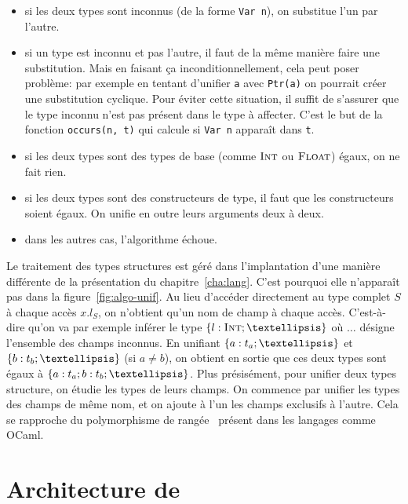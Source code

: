 \begin{itemize}

\item si les deux types sont inconnus (de la forme \texttt{Var n}), on substitue
l'un par l'autre.

\item si un type est inconnu et pas l'autre, il faut de la même manière faire
une substitution.
Mais en faisant ça inconditionnellement, cela peut poser problème:
par exemple en tentant d'unifier \texttt{a} avec \verb!Ptr(a)! on pourrait
créer une substitution cyclique.
Pour éviter cette situation, il suffit de s'assurer que le type inconnu n'est
pas présent dans le type à affecter. C'est le but de la fonction
\texttt{occurs(n, t)} qui calcule si \texttt{Var n} apparaît dans \texttt{t}.

\item si les deux types sont des types de base (comme $\textsc{Int}$ ou $\textsc{Float}$)
égaux, on ne fait rien.

\item si les deux types sont des constructeurs de type, il faut que les
constructeurs soient égaux. On unifie en outre leurs arguments deux à deux.

\item dans les autres cas, l'algorithme échoue.

\end{itemize}

Le traitement des types structures est géré dans l'implantation d'une manière
différente de la présentation du chapitre~\ref{cha:lang}. C'est pourquoi elle
n'apparaît pas dans la figure~\ref{fig:algo-unif}. Au lieu d'accéder directement
au type complet $S$ à chaque accès $x.l_S$, on n'obtient qu'un nom de champ à
chaque accès. C'est-à-dire qu'on va par exemple inférer le type $\tStruct{ l:
\tInt ; … }$ où $…$ désigne l'ensemble des champs inconnus. En unifiant
$\tStruct{ a: t_a ; … }$ et $\tStruct{ b: t_b ; … }$ (si $a ≠ b$), on obtient en
sortie que ces deux types sont égaux à $\tStruct{ a: t_a; b: t_b ; … }$. Plus
présisément, pour unifier deux types structure, on étudie les types de leurs
champs. On commence par unifier les types des champs de même nom, et on ajoute à
l'un les champs exclusifs à l'autre. Cela se rapproche du polymorphisme de
rangée~\cite{ocamlObjects} présent dans les langages comme OCaml.

\section{Architecture de \ptrtype}
\label{sec:ptrtype-archi}

